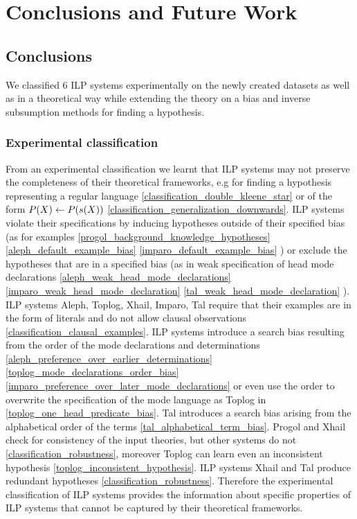 \chapter{Conclusions and Future Work}\label{ch:conclusions}

\section{Conclusions}
We classified 6 ILP systems experimentally on the newly created datasets as well as in a theoretical way while extending the theory on a bias and inverse subsumption methods for finding a hypothesis.

\subsection{Experimental classification}
From an experimental classification we learnt that ILP systems may not preserve the completeness of their theoretical frameworks, e.g for finding a hypothesis representing a regular language \ref{classification_double_kleene_star} or of the form $P(X) \leftarrow P(s(X))$ \ref{classification_generalization_downwards}.
ILP systems violate their specifications by inducing hypotheses outside of their specified bias (as for examples
\ref{progol_background_knowledge_hypotheses}
\ref{aleph_default_example_bias}
\ref{imparo_default_example_bias}
) or exclude the hypotheses that are in a specified bias (as in weak specification of head mode declarations
\ref{aleph_weak_head_mode_declarations}
\ref{imparo_weak_head_mode_declaration}
\ref{tal_weak_head_mode_declaration}
).
ILP systems Aleph, Toplog, Xhail, Imparo, Tal require that their examples are in the form of literals and do not allow clausal observations \ref{classification_clausal_examples}.
ILP systems introduce a search bias resulting from the order of the mode declarations and determinations 
\ref{aleph_preference_over_earlier_determinations}
\ref{toplog_mode_declarations_order_bias}
\ref{imparo_preference_over_later_mode_declarations}
 or
even use the order to overwrite the specification of the mode language as Toplog in \ref{toplog_one_head_predicate_bias}.
Tal introduces a search bias arising from the alphabetical order of the terms \ref{tal_alphabetical_term_bias}.
Progol and Xhail check for consistency of the input theories, but other systems do not \ref{classification_robustness}, moreover Toplog can learn even an inconsistent hypothesis \ref{toplog_inconsistent_hypothesis}.
ILP systems Xhail and Tal produce redundant hypotheses \ref{classification_robustness}. Therefore the experimental classification of ILP systems provides the information about specific properties of ILP systems that cannot be captured by their theoretical frameworks.

